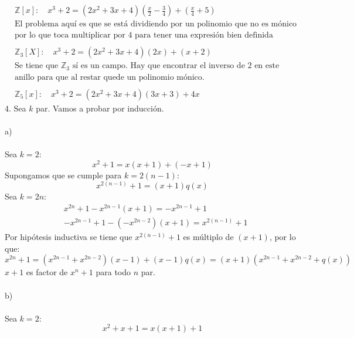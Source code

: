 \documentclass{article}
\begin{document}
\begin{equation*}
\begin{aligned}
    &\mathbb{Z}[x]: \quad x^3 +2 = (2x^2 +3x +4)(\frac{x}{2}-\frac{3}{4})+(\frac{x}{4}+5) \\
    &\text{El problema aquí es que se está dividiendo por un polinomio que no es mónico} \\
    &\text{por lo que toca multiplicar por $4$ para tener una expresión bien definida} \\
    \\
    &\mathbb{Z}_3[X]: \quad x^3 +2 = (2x^2 +3x +4)(2x) + (x+2) \\
    &\text{Se tiene que $\mathbb{Z}_3$ sí es un campo. Hay que encontrar el inverso de 2 en este} \\
    &\text{anillo para que al restar quede un polinomio mónico.} \\
    \\
    &\mathbb{Z}_5[x]: \quad x^3 +2 = (2x^2 +3x +4)(3x +3)+4x 
\end{aligned}
\end{equation*}
4. Sea $k$ par. Vamos a probar por inducción.
\\
\\
a)
\\
\\
Sea $k=2$:
\begin{equation*}
    x^2 +1 = x(x+1) +(-x +1)
\end{equation*}
Supongamos que se cumple para $k=2(n-1)$:
\begin{equation*}
    x^{2(n-1)} +1 = (x+1)q(x)
\end{equation*}
Sea $k=2n$:
\begin{equation*}
\begin{aligned}
    &x^{2n}+1 - x^{2n -1}(x+1) = -x^{2n-1} +1 \\
    & -x^{2n-1} +1 - (-x^{2n-2})(x+1) = x^{2(n-1)}+1
\end{aligned}
\end{equation*}
Por hipótesis inductiva se tiene que $x^{2(n-1)}+1$ es múltiplo de $(x+1)$, por lo que:
\begin{equation*}
    x^{2n} +1 = (x^{2n-1} + x^{2n-2})(x-1)+(x-1)q(x)= (x+1)(x^{2n-1} + x^{2n-2} + q(x))
\end{equation*}
$x+1$ es factor de $x^n +1$ para todo $n$ par.
\\
\\
b) 
\\
\\
Sea $k=2$:
\begin{equation*}
    x^2 +x +1 = x(x+1)+1
\end{equation*}
\end{document}
